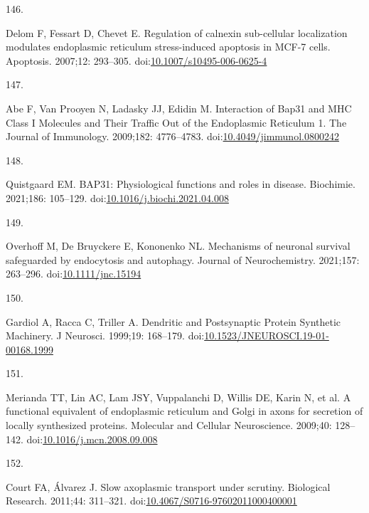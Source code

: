 \documentclass[
  12pt,
  a4paper,
]{book}
\newlength{\cslhangindent}
\newlength{\csllabelwidth}
\newenvironment{CSLReferences}[2] %
 {\begin{list}{}{%
  \setlength{\itemindent}{0pt}
  \setlength{\leftmargin}{0pt}
  \setlength{\parsep}{0pt}
  \ifodd #1
   \setlength{\leftmargin}{\cslhangindent}
   \setlength{\itemindent}{-1\cslhangindent}
  \fi
  \setlength{\itemsep}{#2\baselineskip}}}
 {\end{list}}
\newcommand{\CSLLeftMargin}[1]{\parbox[t]{\csllabelwidth}{\strut#1\strut}}
\newcommand{\CSLRightInline}[1]{\parbox[t]{\linewidth - \csllabelwidth}{\strut#1\strut}}
\begin{document}
\begin{CSLReferences}{0}{1}
\CSLLeftMargin{146. }%
\CSLRightInline{Delom F, Fessart D, Chevet E. Regulation of calnexin sub-cellular localization modulates endoplasmic reticulum stress-induced apoptosis in {MCF-7} cells. Apoptosis. 2007;12: 293--305. doi:\href{https://doi.org/10.1007/s10495-006-0625-4}{10.1007/s10495-006-0625-4}}

\CSLLeftMargin{147. }%
\CSLRightInline{Abe F, Van Prooyen N, Ladasky JJ, Edidin M. Interaction of {Bap31} and {MHC Class I Molecules} and {Their Traffic Out} of the {Endoplasmic Reticulum} 1. The Journal of Immunology. 2009;182: 4776--4783. doi:\href{https://doi.org/10.4049/jimmunol.0800242}{10.4049/jimmunol.0800242}}

\CSLLeftMargin{148. }%
\CSLRightInline{Quistgaard EM. {BAP31}: {Physiological} functions and roles in disease. Biochimie. 2021;186: 105--129. doi:\href{https://doi.org/10.1016/j.biochi.2021.04.008}{10.1016/j.biochi.2021.04.008}}

\CSLLeftMargin{149. }%
\CSLRightInline{Overhoff M, De Bruyckere E, Kononenko NL. Mechanisms of neuronal survival safeguarded by endocytosis and autophagy. Journal of Neurochemistry. 2021;157: 263--296. doi:\href{https://doi.org/10.1111/jnc.15194}{10.1111/jnc.15194}}

\CSLLeftMargin{150. }%
\CSLRightInline{Gardiol A, Racca C, Triller A. Dendritic and {Postsynaptic Protein Synthetic Machinery}. J Neurosci. 1999;19: 168--179. doi:\href{https://doi.org/10.1523/JNEUROSCI.19-01-00168.1999}{10.1523/JNEUROSCI.19-01-00168.1999}}

\CSLLeftMargin{151. }%
\CSLRightInline{Merianda TT, Lin AC, Lam JSY, Vuppalanchi D, Willis DE, Karin N, et al. A functional equivalent of endoplasmic reticulum and {Golgi} in axons for secretion of locally synthesized proteins. Molecular and Cellular Neuroscience. 2009;40: 128--142. doi:\href{https://doi.org/10.1016/j.mcn.2008.09.008}{10.1016/j.mcn.2008.09.008}}

\CSLLeftMargin{152. }%
\CSLRightInline{Court FA, Álvarez J. Slow axoplasmic transport under scrutiny. Biological Research. 2011;44: 311--321. doi:\href{https://doi.org/10.4067/S0716-97602011000400001}{10.4067/S0716-97602011000400001}}


\end{CSLReferences}
\end{document}
